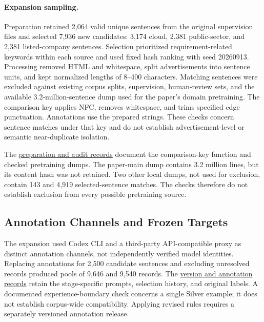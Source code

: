 \paragraph{Expansion sampling.}
Preparation retained 2,064 valid unique sentences from the original supervision files and selected 7,936 new candidates: 3,174 cloud, 2,381 public-sector, and 2,381 listed-company sentences. Selection prioritized requirement-related keywords within each source and used fixed hash ranking with seed 20260913. Processing removed HTML and whitespace, split advertisements into sentence units, and kept normalized lengths of 8--400 characters. Matching sentences were excluded against existing corpus splits, supervision, human-review sets, and the available 3.2-million-sentence dump used for the paper's domain pretraining. The comparison key applies NFC, removes whitespace, and trims specified edge punctuation. Annotations use the prepared strings. These checks concern sentence matches under that key and do not establish advertisement-level or semantic near-duplicate isolation.

The \href{https://github.com/AlfredJamesLi/chinese-skillspan-benchmark/blob/36f009fab01b8433355cb7ef5af8fad02c6cc519/reproduction/process_archive_20260924/source/tex/appendix_D_reproduction_R16.tex}{preparation and audit records} document the comparison-key function and checked pretraining dumps. The paper-main dump contains 3.2 million lines, but its content hash was not retained. Two other local dumps, not used for exclusion, contain 143 and 4,919 selected-sentence matches. The checks therefore do not establish exclusion from every possible pretraining source.



\subsection{Annotation Channels and Frozen Targets}
The expansion used Codex CLI and a third-party API-compatible proxy as distinct annotation channels, not independently verified model identities. Replacing annotations for 2,500 candidate sentences and excluding unresolved records produced pools of 9,646 and 9,540 records. The \href{https://github.com/AlfredJamesLi/chinese-skillspan-benchmark/blob/36f009fab01b8433355cb7ef5af8fad02c6cc519/reproduction/process_archive_20260924/README.md}{version and annotation records} retain the stage-specific prompts, selection history, and original labels. A documented experience-boundary check concerns a single Silver example; it does not establish corpus-wide compatibility. Applying revised rules requires a separately versioned annotation release.

